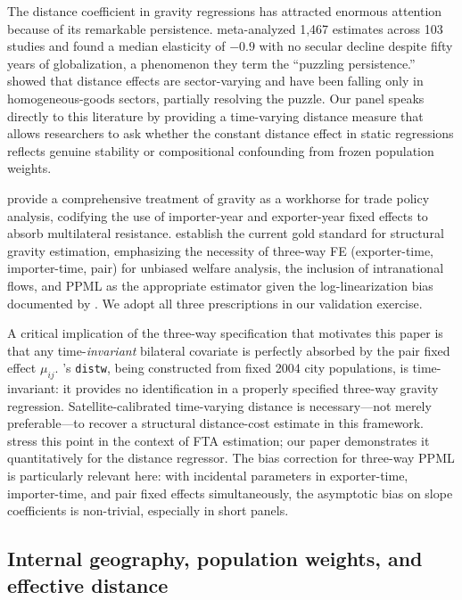 \documentclass[11pt, a4paper]{article}
\begin{document}
The distance coefficient in gravity regressions has attracted enormous
attention because of its remarkable persistence.
\citet{disdier_head_2008} meta-analyzed 1,467 estimates across 103 studies
and found a median elasticity of $-0.9$ with no secular decline despite
fifty years of globalization, a phenomenon they term the ``puzzling persistence.''
\citet{berthelon_freund_2008} showed that distance effects are sector-varying
and have been falling only in homogeneous-goods sectors, partially resolving
the puzzle.
Our panel speaks directly to this literature by providing a time-varying
distance measure that allows researchers to ask whether the constant distance
effect in static regressions reflects genuine stability or compositional
confounding from frozen population weights.

\citet{head_mayer_2014} provide a comprehensive treatment of gravity as
a workhorse for trade policy analysis, codifying the use of importer-year
and exporter-year fixed effects to absorb multilateral resistance.
\citet{yotov_piermartini_monteiro_larch_2016} establish the current gold
standard for structural gravity estimation, emphasizing the necessity of
three-way FE (exporter-time, importer-time, pair) for unbiased welfare
analysis, the inclusion of intranational flows, and PPML as the appropriate
estimator given the log-linearization bias documented by
\citet{santos_silva_tenreyro_2006}.
We adopt all three prescriptions in our validation exercise.

A critical implication of the three-way specification that motivates this paper
is that any time-\emph{invariant} bilateral covariate is perfectly absorbed by
the pair fixed effect $\mu_{ij}$.
\citet{mayer_zignago_2011}'s \texttt{distw}, being constructed from fixed
2004 city populations, is time-invariant: it provides no identification in a
properly specified three-way gravity regression.
Satellite-calibrated time-varying distance is necessary---not merely
preferable---to recover a structural distance-cost estimate in this
framework.
\citet{baier_yotov_zylkin_2019} stress this point in the context of FTA
estimation; our paper demonstrates it quantitatively for the distance regressor.
The \citet{weidner_zylkin_2021} bias correction for three-way PPML is
particularly relevant here: with incidental parameters in exporter-time,
importer-time, and pair fixed effects simultaneously, the asymptotic bias on
slope coefficients is non-trivial, especially in short panels.

\subsection{Internal geography, population weights, and effective distance}
\end{document}
